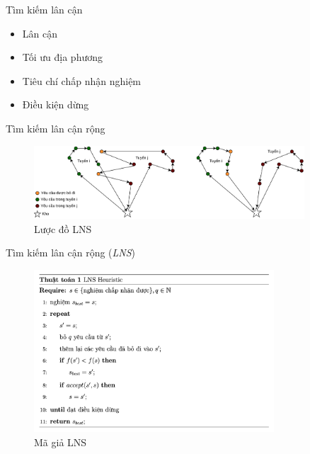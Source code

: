 \begin{frame}{Tìm kiếm lân cận}
  \begin{itemize}
    \item Lân cận
    \item Tối ưu địa phương
    \item Tiêu chí chấp nhận nghiệm
    \item Điều kiện dừng
  \end{itemize}
\end{frame}

\begin{frame}{Tìm kiếm lân cận rộng}
  \begin{figure}[H] %
    \centering %
    \includegraphics[width=0.9\textwidth]{figures/ALNS-paradim.png} 
    \caption{Lược đồ LNS} 
    \label{fig:lns_paradim}
  \end{figure}  
\end{frame}

\begin{frame}{Tìm kiếm lân cận rộng (\textit{LNS})}
  \begin{figure}[H] %
    \centering %
    \includegraphics[width=0.8\textwidth]{figures/pr_LNS.png} 
    \caption{Mã giả LNS} 
    \label{fig:lns_pseudo}
  \end{figure} 
\end{frame}

